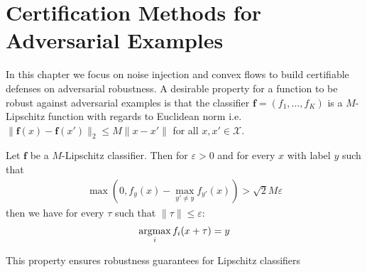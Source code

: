 \chapter{Certification Methods for Adversarial Examples}
\minitoc
\label{chap:certification}
In this chapter we focus on noise injection and convex flows to build certifiable defenses on adversarial robustness. A desirable property for a function to be robust against adversarial examples is that the classifier $\mathbf{f}=(f_1,\dots,f_K)$ is a $M$-Lipschitz function with regards to Euclidean norm i.e. $\lVert \mathbf{f}(x)-\mathbf{f}(x')\rVert_2\leq M\lVert x-x'\rVert$ for all $x,x'\in\mathcal{X}$. 

\begin{prop}Let $\mathbf{f}$ be a  $M$-Lipschitz classifier. Then for $\varepsilon>0$ and for every $x$ with label $y$ such that \begin{align*}
    \max(0,f_y(x)-\max_{y'\neq y}f_{y'}(x))> \sqrt{2}M\varepsilon
\end{align*}
then we have for every $\tau$ such that $\lVert \tau\rVert\leq \varepsilon$:
\begin{align*}
    \operatorname*{argmax}_{i}f_i(x+\tau)=y
\end{align*}
\end{prop}

This property ensures robustness guarantees for Lipschitz classifiers



